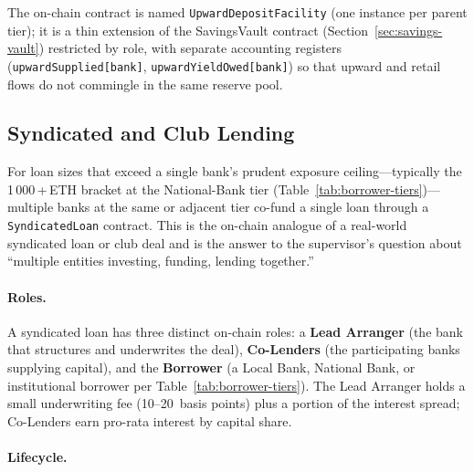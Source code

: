\documentclass[12pt,a4paper]{report}
\begin{document}
The on-chain contract is named \texttt{UpwardDepositFacility} (one instance per parent tier); it is a thin extension of the SavingsVault contract (Section~\ref{sec:savings-vault}) restricted by role, with separate accounting registers (\texttt{upwardSupplied[bank]}, \texttt{upwardYieldOwed[bank]}) so that upward and retail flows do not commingle in the same reserve pool.

\subsection{Syndicated and Club Lending}
\label{sec:syndicated-lending}

For loan sizes that exceed a single bank's prudent exposure ceiling---typically the 1\,000\,+\,ETH bracket at the National-Bank tier (Table~\ref{tab:borrower-tiers})---multiple banks at the same or adjacent tier co-fund a single loan through a \texttt{SyndicatedLoan} contract. This is the on-chain analogue of a real-world syndicated loan or club deal and is the answer to the supervisor's question about ``multiple entities investing, funding, lending together.''

\paragraph{Roles.}
A syndicated loan has three distinct on-chain roles: a \textbf{Lead Arranger} (the bank that structures and underwrites the deal), \textbf{Co-Lenders} (the participating banks supplying capital), and the \textbf{Borrower} (a Local Bank, National Bank, or institutional borrower per Table~\ref{tab:borrower-tiers}). The Lead Arranger holds a small underwriting fee (10--20~basis points) plus a portion of the interest spread; Co-Lenders earn pro-rata interest by capital share.

\paragraph{Lifecycle.}
\end{document}
